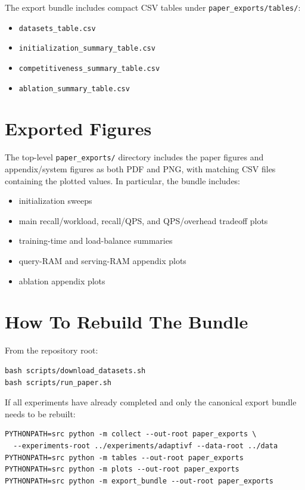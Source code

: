 The export bundle includes compact CSV tables under \texttt{paper\_exports/tables/}:
\begin{itemize}
  \item \texttt{datasets\_table.csv}
  \item \texttt{initialization\_summary\_table.csv}
  \item \texttt{competitiveness\_summary\_table.csv}
  \item \texttt{ablation\_summary\_table.csv}
\end{itemize}

\section{Exported Figures}
\label{sec:appendix:figures}

The top-level \texttt{paper\_exports/} directory includes the paper figures and
appendix/system figures as both PDF and PNG, with matching CSV files containing
the plotted values. In particular, the bundle includes:
\begin{itemize}
  \item initialization sweeps
  \item main recall/workload, recall/QPS, and QPS/overhead tradeoff plots
  \item training-time and load-balance summaries
  \item query-RAM and serving-RAM appendix plots
  \item ablation appendix plots
\end{itemize}

\section{How To Rebuild The Bundle}
\label{sec:appendix:rebuild}

From the repository root:
\begin{verbatim}
bash scripts/download_datasets.sh
bash scripts/run_paper.sh
\end{verbatim}

If all experiments have already completed and only the canonical export bundle
needs to be rebuilt:
\begin{verbatim}
PYTHONPATH=src python -m collect --out-root paper_exports \
  --experiments-root ../experiments/adaptivf --data-root ../data
PYTHONPATH=src python -m tables --out-root paper_exports
PYTHONPATH=src python -m plots --out-root paper_exports
PYTHONPATH=src python -m export_bundle --out-root paper_exports
\end{verbatim}
